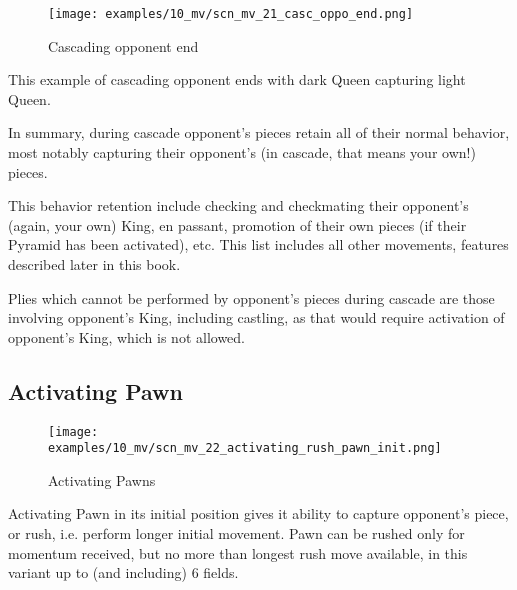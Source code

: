 \clearpage %

\noindent
\begin{wrapfigure}[4]{l}{0.5625\textwidth}
\centering
\texttt{[image: examples/10\_mv/scn\_mv\_21\_casc\_oppo\_end.png]}
\caption{Cascading opponent end}
\label{fig:scn_mv_21_casc_oppo_end}
\end{wrapfigure}
This example of cascading opponent ends with dark Queen capturing light Queen.

\vspace*{0.355\textheight}
In summary, during cascade opponent's pieces retain all of their normal behavior,
most notably capturing their opponent's (in cascade, that means your own!) pieces.

This behavior retention include checking and checkmating their opponent's (again,
your own) King, en passant, promotion of their own pieces (if their Pyramid has
been activated), etc. This list includes all other movements, features described
later in this book.

Plies which cannot be performed by opponent's pieces during cascade are those
involving opponent's King, including castling, as that would require activation
of opponent's King, which is not allowed.

\clearpage %

\subsection*{Activating Pawn}

\noindent
\begin{figure}[!h]
\texttt{[image: examples/10\_mv/scn\_mv\_22\_activating\_rush\_pawn\_init.png]}
\caption{Activating Pawns}
\label{fig:scn_mv_22_activating_rush_pawn_init}
\end{figure}

Activating Pawn in its initial position gives it ability to capture opponent's
piece, or rush, i.e. perform longer initial movement. Pawn can be rushed only for
momentum received, but no more than longest rush move available, in this variant
up to (and including) 6 fields.

